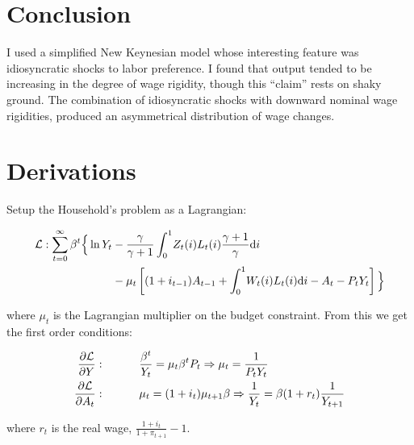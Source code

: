 \documentclass[12pt,a4paper]{scrartcl}            %
\begin{document}
\section{Conclusion}

I used a simplified New Keynesian model whose interesting feature was idiosyncratic shocks to labor preference.
I found that output tended to be increasing in the degree of wage rigidity, though this ``claim'' rests on shaky ground.
The combination of idiosyncratic shocks with downward nominal wage rigidities, produced an asymmetrical distribution of wage changes.


\newpage



\newpage
\appendix

\section{Derivations}

Setup the Household's problem as a Lagrangian:

\begin{equation}
    \label{eqa:houehold}
    \begin{split}
        \mathcal{L} : \sum_{t=0}^{\infty} \beta^t \Big\{ \ln Y_t & - \frac{\gamma}{\gamma + 1} \int_{0}^{1} \! Z_t(i)L_t(i) \frac{\gamma + 1}{\gamma} \mathrm{d}i \\
                                                           & - \mu_t \left[ (1 + i_{t-1})A_{t-1} + \int_{0}^{1} \! W_t(i)L_t(i) \mathrm{d}i  - A_t - P_tY_t\right] \Big\}
    \end{split}
\end{equation}

where $\mu_t$ is the Lagrangian multiplier on the budget constraint.
From this we get the first order conditions:

\begin{equation}
\begin{aligned}
    \label{eqa:focs}
    \frac{\partial \Lagr}{\partial Y} & :   \ \ \ \ \ \ \ \ \  \frac{\beta^t}{Y_t} = \mu_t \beta^t P_t \Rightarrow \mu_t = \frac{1}{P_t Y_t} \\
    \frac{\partial \Lagr}{\partial A_t} & : \ \ \ \ \ \ \ \ \  \mu_t = (1 + i_t) \mu_{t + 1} \beta \Rightarrow \frac{1}{Y_t} = \beta (1 + r_t) \frac{1}{Y_{t+1}}
\end{aligned}
\end{equation}

where $r_t$ is the real wage, $\frac{1 + i_t}{1 + \pi_{t+1}} - 1$.
\end{document}
